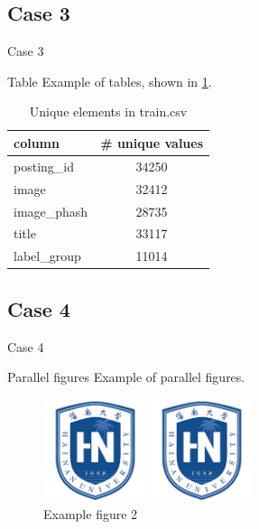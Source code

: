 \documentclass{beamer}
\begin{document}
\subsection{Case 3}

\begin{frame}{Case 3}
  \begin{block}{Table}
    Example of tables, shown in \ref{tab:unique_values}. 

    \begin{table}[htbp]
      \small
      \centering
      \caption{Unique elements in train.csv }
      \label{tab:unique_values}
      \begin{tabular}{lc}
        \toprule
        column & \# unique values \\
        \midrule
        posting\_id & 34250 \\
        image & 32412 \\
        image\_phash & 28735 \\
        title & 33117 \\
        label\_group & 11014 \\
        \bottomrule
      \end{tabular}
    \end{table}
  \end{block}
\end{frame}

\subsection{Case 4}

\begin{frame}{Case 4}
  \begin{block}{Parallel figures}
    Example of parallel figures.
  \end{block}
  \begin{figure}[htbp]
    \centering
    \begin{minipage}[t]{0.48\textwidth}
      \centering
      \includegraphics[width=3cm]{hainanulogo.pdf}
      \caption{Example figure 1}
      \label{fig:left_side}
    \end{minipage}
    \begin{minipage}[t]{0.48\textwidth}
      \centering
      \includegraphics[width=3cm]{hainanulogo.pdf}
      \caption{Example figure 2}
      \label{fig:right_side}
    \end{minipage}
  \end{figure}
\end{frame}
\end{document}
